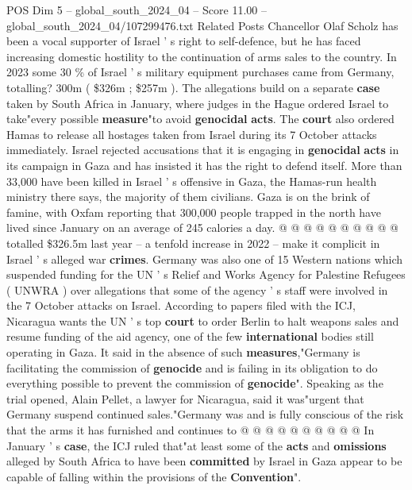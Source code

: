 \begin{textsample}{POS Dim 5 – global\_south\_2024\_04 – Score 11.00 – global\_south\_2024\_04/107299476.txt}  \label{ex:f5_pos_337}
Related Posts Chancellor Olaf Scholz has been a vocal supporter of Israel ' s right to self-defence, but he has faced increasing domestic hostility to the continuation of arms sales to the country.
In 2023 some 30 \% of Israel ' s military equipment purchases came from Germany, totalling? 300m ( \$326m ; \$257m ).
The allegations build on a separate \textbf{case} taken by South Africa in January, where judges in the Hague ordered Israel to take"every possible \textbf{measure}"to avoid \textbf{genocidal} \textbf{acts}.
The \textbf{court} also ordered Hamas to release all hostages taken from Israel during its 7 October attacks immediately.
Israel rejected accusations that it is engaging in \textbf{genocidal} \textbf{acts} in its campaign in Gaza and has insisted it has the right to defend itself.
More than 33,000 have been killed in Israel ' s offensive in Gaza, the Hamas-run health ministry there says, the majority of them civilians.
Gaza is on the brink of famine, with Oxfam reporting that 300,000 people trapped in the north have lived since January on an average of 245 calories a day. @ @ @ @ @ @ @ @ @ @ totalled \$326.5m last year -- a tenfold increase in 2022 -- make it complicit in Israel ' s alleged war \textbf{crimes}.
Germany was also one of 15 Western nations which suspended funding for the UN ' s Relief and Works Agency for Palestine Refugees ( UNWRA ) over allegations that some of the agency ' s staff were involved in the 7 October attacks on Israel.
According to papers filed with the ICJ, Nicaragua wants the UN ' s top \textbf{court} to order Berlin to halt weapons sales and resume funding of the aid agency, one of the few \textbf{international} bodies still operating in Gaza.
It said in the absence of such \textbf{measures},"Germany is facilitating the commission of \textbf{genocide} and is failing in its obligation to do everything possible to prevent the commission of \textbf{genocide}".
Speaking as the trial opened, Alain Pellet, a lawyer for Nicaragua, said it was"urgent that Germany suspend continued sales."Germany was and is fully conscious of the risk that the arms it has furnished and continues to @ @ @ @ @ @ @ @ @ @ In January ' s \textbf{case}, the ICJ ruled that"at least some of the \textbf{acts} and \textbf{omissions} alleged by South Africa to have been \textbf{committed} by Israel in Gaza appear to be capable of falling within the provisions of the \textbf{Convention}".

\end{textsample}
